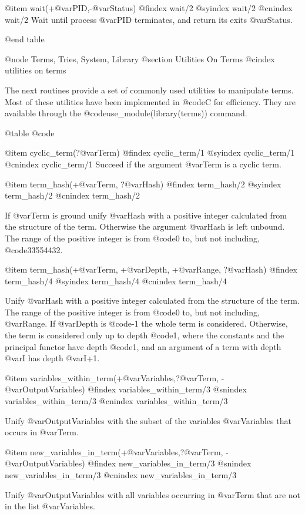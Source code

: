 {{{{{{{{@item wait(+@var{PID},-@var{Status})
@findex  wait/2
@syindex wait/2
@cnindex wait/2
Wait until process @var{PID} terminates, and return its exits @var{Status}.

@end table


@node Terms, Tries, System, Library
@section Utilities On Terms
@cindex utilities on terms

The next routines provide a set of commonly used utilities to manipulate
terms. Most of these utilities have been implemented in @code{C} for
efficiency. They are available through the
@code{use_module(library(terms))} command.

@table @code

@item cyclic_term(?@var{Term})
@findex cyclic_term/1
@syindex cyclic_term/1
@cnindex cyclic_term/1
Succeed if the argument @var{Term} is a cyclic term.

@item term_hash(+@var{Term}, ?@var{Hash})
@findex  term_hash/2
@syindex term_hash/2
@cnindex term_hash/2

If @var{Term} is ground unify @var{Hash} with a positive integer
calculated from the structure of the term. Otherwise the argument
@var{Hash} is left unbound. The range of the positive integer is from
@code{0} to, but not including, @code{33554432}.

@item term_hash(+@var{Term}, +@var{Depth}, +@var{Range}, ?@var{Hash})
@findex  term_hash/4
@syindex term_hash/4
@cnindex term_hash/4

Unify @var{Hash} with a positive integer calculated from the structure
of the term.  The range of the positive integer is from @code{0} to, but
not including, @var{Range}. If @var{Depth} is @code{-1} the whole term
is considered. Otherwise, the term is considered only up to depth
@code{1}, where the constants and the principal functor have depth
@code{1}, and an argument of a term with depth @var{I} has depth @var{I+1}. 

@item variables_within_term(+@var{Variables},?@var{Term}, -@var{OutputVariables})
@findex  variables_within_term/3
@snindex variables_within_term/3 
@cnindex variables_within_term/3  

Unify @var{OutputVariables} with the subset of the variables @var{Variables} that occurs in @var{Term}.

@item new_variables_in_term(+@var{Variables},?@var{Term}, -@var{OutputVariables})
@findex  new_variables_in_term/3
@snindex new_variables_in_term/3 
@cnindex new_variables_in_term/3  

Unify @var{OutputVariables} with all variables occurring in @var{Term} that are not in the list @var{Variables}.

}}}}}}}}
